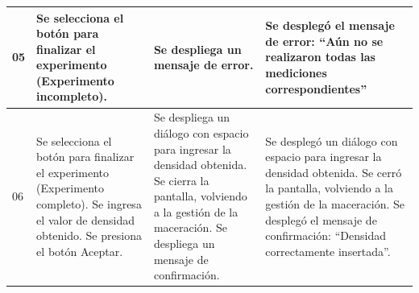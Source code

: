 \begin{longtable}{|p{0.6cm}|p{4cm}|p{4.7cm}|p{4.7cm}|}
    \hline
    05 & Se selecciona el botón para finalizar el experimento (Experimento incompleto). & Se despliega un mensaje de error. & Se desplegó el mensaje de error: ``Aún no se realizaron todas las mediciones correspondientes'' \\
    \hline
    06 & Se selecciona el botón para finalizar el experimento (Experimento completo). Se ingresa el valor de densidad obtenido. Se presiona el botón Aceptar. & Se despliega un diálogo con espacio para ingresar la densidad obtenida. Se cierra la pantalla, volviendo a la gestión de la maceración. Se despliega un mensaje de confirmación. & Se desplegó un diálogo con espacio para ingresar la densidad obtenida. Se cerró la pantalla, volviendo a la gestión de la maceración. Se desplegó el mensaje de confirmación: ``Densidad correctamente insertada''. \\
    \hline

 \end{longtable}



